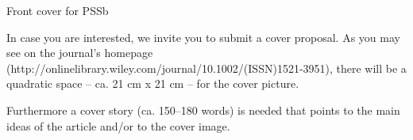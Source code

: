 Front cover for PSSb

In case you are interested, we invite you to submit a cover proposal. As you may see on the journal's homepage (http://onlinelibrary.wiley.com/journal/10.1002/(ISSN)1521-3951), there will be a quadratic space -- ca. 21 cm x 21 cm -- for the cover picture.

Furthermore a cover story (ca. 150--180 words) is needed that points to the main ideas of the article and/or to the cover image.


